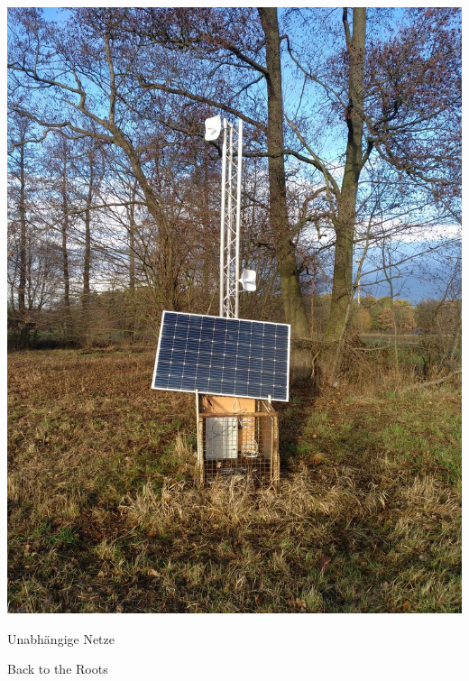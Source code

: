\documentclass{beamer}
\begin{document}
	\begin{frame}
		\includegraphics[height=0.75\framewidth]{media/p2p-solar.jpg}
	\end{frame}


	\begin{frame}{Unabhängige Netze}
	\end{frame}
	\begin{frame}{Back to the Roots}
	\end{frame}
\end{document}
